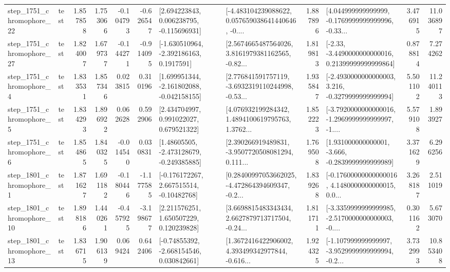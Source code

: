 \begin{tabular}{llrrrrllrlrr}
 step\_1751\_chromophore\_22 &      test &      1.857858 &    1.753066 &     -0.104793 & -0.626547 &    [2.694223843, 0.006238795, -0.115696931] &  [-4.483104239088622, 0.057659038641440646, -0.... &       1.887896 &  [4.044999999999999, -0.1769999999999996, -0.33... &            3.476915 &         11.036897 \\
 step\_1751\_chromophore\_27 &      test &      1.824007 &    1.679737 &     -0.144271 & -0.914095 &     [-1.630510964, -2.392186163, 0.1917591] &  [2.5674665487564026, 3.8161979381162565, -0.82... &       1.819813 &  [-2.33, -3.4490000000000016, 0.21399999999999864] &            0.878814 &          7.274262 \\
  step\_1751\_chromophore\_4 &      test &      1.833531 &    1.857346 &      0.023815 &  0.310196 &   [1.699951344, -2.161802088, -0.042158155] &  [2.776841591757119, -3.6932319110244998, -0.53... &       1.935847 &  [-2.4930000000000003, 3.216, -0.3279999999999994] &            5.501102 &         11.240113 \\
  step\_1751\_chromophore\_5 &      test &      1.834293 &    1.896922 &      0.062628 &  0.592906 &     [2.434704997, 0.991022027, 0.679521322] &  [4.076932199284342, 1.4894100619795763, 1.3762... &       1.852223 &  [-3.7920000000000016, -1.2969999999999997, -1.... &            5.579108 &          1.893927 \\
  step\_1751\_chromophore\_6 &      test &      1.854865 &    1.840325 &     -0.014540 &  0.030831 &    [1.48605505, -2.473128679, -0.249385885] &  [2.390266919489831, -3.9507720508081294, 0.111... &       1.769508 &   [1.931000000000001, -3.666, -0.2839999999999989] &            3.371629 &          6.296256 \\
  step\_1801\_chromophore\_1 &      test &      1.871627 &    1.691182 &     -0.180446 & -1.177585 &    [-0.176172267, 2.667515514, -0.10482768] &  [0.28400997053662025, -4.472864394609347, -0.2... &       1.839268 &  [-0.17600000000000016, 4.1480000000000015, 0.0... &            3.268187 &          2.511019 \\
 step\_1801\_chromophore\_10 &      test &      1.898186 &    1.440261 &     -0.457925 & -3.198677 &     [2.211576251, 1.650507229, 0.120239828] &  [3.6698815483343434, 2.6627879713717504, -0.24... &       1.811711 &  [-3.3359999999999985, -2.5170000000000003, -0.... &            0.301162 &          5.673070 \\
 step\_1801\_chromophore\_13 &      test &      1.836715 &    1.906139 &      0.069424 &  0.642406 &    [-0.74855392, -2.668154546, 0.030842661] &  [1.3672416422906002, 4.393499342977844, -0.616... &       1.924325 &  [-1.107999999999997, -3.9529999999999994, -0.2... &            3.732993 &         10.853408 \\

\end{tabular}
